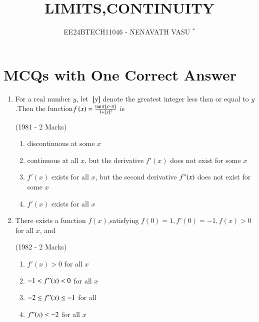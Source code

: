\documentclass[journal,12pt,twocolumn]{IEEEtran}
\theoremstyle{remark}
\begin{document}

\vspace{3cm}

\title{LIMITS,CONTINUITY}
\author{EE24BTECH11046 - NENAVATH VASU $^{*}$%
}
\maketitle
\newpage
\bigskip

\renewcommand{\thefigure}{\theenumi}
\renewcommand{\thetable}{\theenumi}


\section{ MCQs with One Correct Answer}



\begin{enumerate}[start=2]
   
\item For a real number $y$, let ${}\left[y\right]$ denote the greatest integer less thsn or equal to $y$.Then the function{$f\left(x\right)=\frac{\tan\pi{}\left[x-\pi\right]}{1+[x]^2}$} is

\hfill                    (1981 - 2 Marks)
   \begin{enumerate}
       \item discontinuous at some $x$
        \item continuous at all $x$, but the derivative $f'(x)$ does not exist for some $x$
        \item $f'(x)$ exists for all $x$, but the second derivative $f"(x)$ does not exist for some $x$
        \item $f'(x)$ exists for all $x$
   \end{enumerate}




\item There exists a function $f(x)$,satisfying $f(0)=1,f'(0)=-1,f(x)>0$ for all $x$, and 

\hfill      (1982 - 2 Marks)
    \begin{enumerate}

          \item $f'(x) > 0$ for all $x$
          \item$ -1 < f"(x) < 0$ for all $x$
          \item $-2 \leq f"(x) \leq -1$ for  all 
          \item $f"(x) < -2$ for all $x$

          
          

\end{enumerate}
\end{enumerate}
\end{document}
